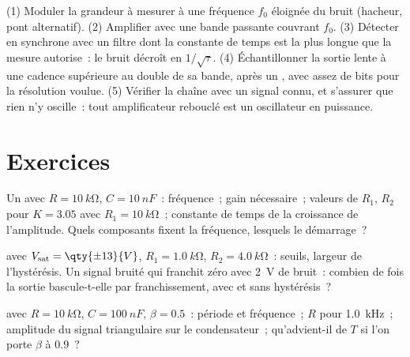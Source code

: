 \begin{method}\label{met:b2:feedback-oscillators:method}
(1) Moduler la grandeur à mesurer à une fréquence $f_0$ éloignée du
bruit (hacheur, pont alternatif). (2) Amplifier avec une bande passante couvrant
$f_0$. (3) Détecter en synchrone avec un filtre dont la constante de temps est
la plus longue que la mesure autorise~: le bruit décroît en
$1/\sqrt\tau$. (4) Échantillonner la sortie lente à une cadence supérieure au double de sa
bande, après un , avec assez de bits pour la
résolution voulue. (5) Vérifier la chaîne avec un signal connu, et s'assurer que
rien n'y oscille~: tout amplificateur rebouclé est un oscillateur en puissance.
\end{method}

\section{Exercices}

\begin{exercise}[$\star$]\label{exo:b2:feedback-oscillators:1}
Un  avec $R = \qty{10}{k\ohm}$, $C = \qty{10}{nF}$~:
fréquence~; gain nécessaire~; valeurs de $R_1$, $R_2$ pour $K = 3.05$ avec $R_1 =
\qty{10}{k\ohm}$~; constante de temps de la croissance de l'amplitude. Quels composants
fixent la fréquence, lesquels le démarrage~?
\end{exercise}

\begin{exercise}[$\star$]\label{exo:b2:feedback-oscillators:2}
 avec $V_{\text{sat}} = \qty{\pm 13}{V}$, $R_1 = \qty{1.0}{k\ohm}$,
$R_2 = \qty{4.0}{k\ohm}$~: seuils, largeur de l'hystérésis. Un signal bruité
qui franchit zéro avec \qty{2}{V} de bruit~: combien de fois la sortie
bascule-t-elle par franchissement, avec et sans hystérésis~?
\end{exercise}

\begin{exercise}[$\star$]\label{exo:b2:feedback-oscillators:3}
 avec $R = \qty{10}{k\ohm}$, $C = \qty{100}{nF}$, $\beta = 0.5$~:
période et fréquence~; $R$ pour \qty{1.0}{kHz}~; amplitude du signal triangulaire
sur le condensateur~; qu'advient-il de $T$ si l'on porte $\beta$ à $0.9$~?
\end{exercise}

